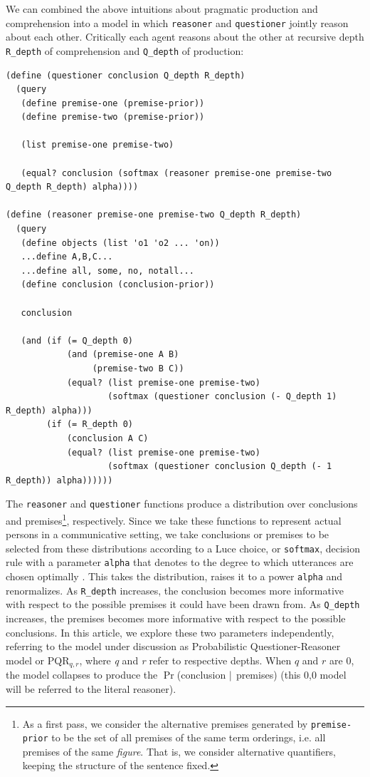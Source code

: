 \documentclass[10pt,letterpaper]{article}
\begin{document}
We can combined the above intuitions about pragmatic production and comprehension into a model in which \lstinline{reasoner} and \lstinline{questioner} jointly reason about each other. Critically each agent reasons about the other at recursive depth \lstinline{R_depth} of comprehension and \lstinline{Q_depth} of production:
\begin{lstlisting}
(define (questioner conclusion Q_depth R_depth)
  (query 
   (define premise-one (premise-prior))
   (define premise-two (premise-prior))
   
   (list premise-one premise-two)
   
   (equal? conclusion (softmax (reasoner premise-one premise-two Q_depth R_depth) alpha))))

(define (reasoner premise-one premise-two Q_depth R_depth)
  (query 
   (define objects (list 'o1 'o2 ... 'on)) 
   ...define A,B,C...
   ...define all, some, no, notall...
   (define conclusion (conclusion-prior))
   
   conclusion
   
   (and (if (= Q_depth 0)
            (and (premise-one A B)
                 (premise-two B C))
            (equal? (list premise-one premise-two) 
                    (softmax (questioner conclusion (- Q_depth 1) R_depth) alpha)))
        (if (= R_depth 0)
            (conclusion A C)
            (equal? (list premise-one premise-two) 
                    (softmax (questioner conclusion Q_depth (- 1 R_depth)) alpha))))))
\end{lstlisting}
The \lstinline{reasoner} and \lstinline{questioner} functions produce a distribution over conclusions and premises\footnote{As a first pass, we consider the alternative premises generated by \lstinline{premise-prior} to be the set of all premises of the same term orderings, i.e. all premises of the same \emph{figure}. That is, we consider alternative quantifiers, keeping the structure of the sentence fixed.}, respectively. Since we take these functions to represent actual persons in a communicative setting, we take conclusions or premises to be selected from these distributions according to a Luce choice, or \lstinline{softmax}, decision rule with a parameter \lstinline{alpha} that denotes to the degree to which utterances are chosen optimally \cite{luce1959}. This takes the distribution, raises it to a power \lstinline{alpha} and renormalizes. As \lstinline{R_depth} increases, the conclusion becomes more informative with respect to the possible premises it could have been drawn from. As \lstinline{Q_depth} increases, the premises becomes more informative with respect to the possible conclusions. In this article, we explore these two parameters independently, referring to the model under discussion as Probabilistic Questioner-Reasoner model or PQR$_{q,r}$, where \emph{q} and \emph{r} refer to respective depths. When $q$ and $r$ are 0, the model collapses to produce the $\Pr$(conclusion $\arrowvert$ premises) (this 0,0 model will be referred to the literal reasoner). 
\end{document}
